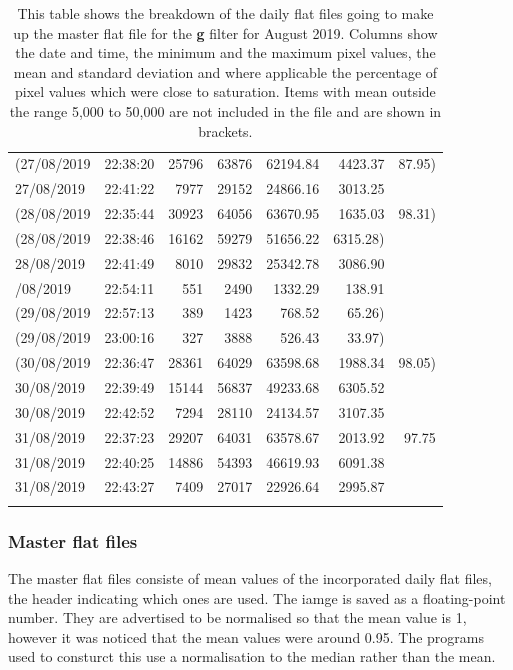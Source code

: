 \begin{longtable}{llrrrrr}
(27/08/2019 & 22:38:20 & 25796 & 63876 & 62194.84 & 4423.37 & 87.95) \\
27/08/2019 & 22:41:22 & 7977 & 29152 & 24866.16 & 3013.25 &  \\
(28/08/2019 & 22:35:44 & 30923 & 64056 & 63670.95 & 1635.03 & 98.31) \\
(28/08/2019 & 22:38:46 & 16162 & 59279 & 51656.22 & 6315.28) &  \\
28/08/2019 & 22:41:49 & 8010 & 29832 & 25342.78 & 3086.90 &  \\
\pagebreak[4]
29/08/2019 & 22:54:11 & 551 & 2490 & 1332.29 & 138.91 &  \\
(29/08/2019 & 22:57:13 & 389 & 1423 & 768.52 & 65.26) &  \\
(29/08/2019 & 23:00:16 & 327 & 3888 & 526.43 & 33.97) &  \\
(30/08/2019 & 22:36:47 & 28361 & 64029 & 63598.68 & 1988.34 & 98.05) \\
30/08/2019 & 22:39:49 & 15144 & 56837 & 49233.68 & 6305.52 &  \\
30/08/2019 & 22:42:52 & 7294 & 28110 & 24134.57 & 3107.35 &  \\
31/08/2019 & 22:37:23 & 29207 & 64031 & 63578.67 & 2013.92 & 97.75 \\
31/08/2019 & 22:40:25 & 14886 & 54393 & 46619.93 & 6091.38 &  \\
31/08/2019 & 22:43:27 & 7409 & 27017 & 22926.64 & 2995.87 &  \\
\hline
\captionsetup{skip=20pt}
\caption{
This table shows the breakdown of the daily flat files going to
make up the master flat file for the \textbf{g} filter for August
2019. Columns show the date and time, the minimum and the maximum pixel values,
the mean and standard deviation and where applicable the percentage of pixel
values which were close to saturation. Items with mean outside the range 5,000
to 50,000 are not included in the file and are shown in brackets.}
\protect\label{table:flatdist}
\end{longtable}

\subsubsection{Master flat files}
\protect\label{section:masterflatfiles}

The master flat files consiste of mean values of the incorporated daily flat
files, the header indicating which ones are used. The iamge is saved as a
floating-point number. They are advertised to be normalised so that the mean
value is 1, however it was noticed that the mean values were around 0.95. The
programs used to consturct this use a normalisation to the median rather than
the mean.

